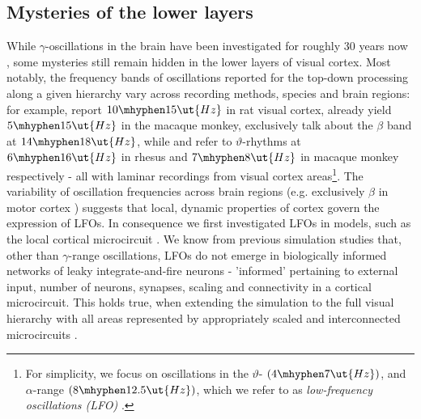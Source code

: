 \subsection{Mysteries of the lower layers}
While $\gamma$-oscillations in the brain have been investigated for roughly 30 years now \citep{Gray1989}, some mysteries still remain hidden in the lower layers of visual cortex.
Most notably, the frequency bands of oscillations reported for the top-down processing along a given hierarchy vary across recording methods, species and brain regions: 
for example, \cite[abstract]{Sun} report $10\mhyphen15\ut{Hz}$ in rat visual cortex, \cite[p2, bottom]{VanKerkoerle} already yield $5\mhyphen15\ut{Hz}$ in the macaque monkey, \cite[see abstract]{AndreMoraesBastos2015} exclusively talk about the $\beta$ band at $14\mhyphen18\ut{Hz}$, while \cite[abstract]{Buffalo11_11262} and \cite[abstract]{Fries2015} refer to $\vartheta$-rhythms at $6\mhyphen16\ut{Hz}$ in rhesus and $7\mhyphen8\ut{Hz}$ in macaque monkey respectively - all with laminar recordings from visual cortex areas\footnote{For simplicity, we focus on oscillations in the $\vartheta$- $(4\mhyphen7\ut{Hz})$, and $\alpha$-range $(8\mhyphen12.5\ut{Hz})$, which we refer to as \textit{low-frequency oscillations (LFO)} \citep[definition of the frequency bands]{Gerrard2007, VanAlbada2009}.}.
The variability of oscillation frequencies across brain regions (e.g. exclusively $\beta$ in motor cortex \citep{Schoeffelen2005}) suggests that local, dynamic properties of cortex govern the expression of LFOs. 
In consequence we first investigated LFOs in models, such as the local cortical microcircuit \citep{Potjans}.
We know from previous simulation studies \citep{Potjans} that, other than $\gamma$-range oscillations, LFOs do not emerge in biologically informed networks of leaky integrate-and-fire neurons - 'informed' pertaining to external input, number of neurons, synapses, scaling and connectivity in a cortical microcircuit. 
This holds true, when extending the simulation to the full visual hierarchy with all areas represented by appropriately scaled and interconnected microcircuits \citep{Schmidt2015a}.

